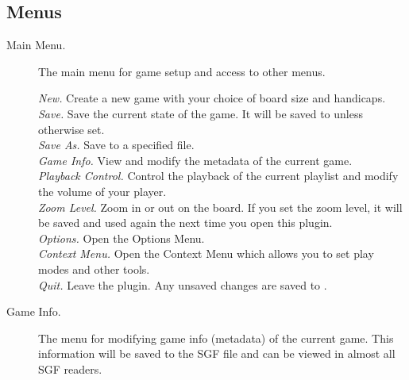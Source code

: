 \subsection{Menus}
\begin {description}
\item [Main Menu. ]
    The main menu for game setup and access to other menus.

    \emph {New. } Create a new game with your choice of board size and handicaps. \\
    \emph {Save. } Save the current state of the game.  It will be saved to
     unless otherwise set. \\
    \emph {Save As. } Save to a specified file. \\
    \emph {Game Info. } View and modify the metadata of the current game. \\
    \emph {Playback Control. } Control the playback of the current playlist and
    modify the volume of your player. \\
    \emph {Zoom Level. } Zoom in or out on the board.  If you set the zoom level, it
    will be saved and used again the next time you open this plugin. \\
    \emph {Options. } Open the Options Menu. \\
    \emph {Context Menu. } Open the Context Menu which allows you to set play modes
    and other tools. \\
    \emph {Quit. } Leave the plugin.  Any unsaved changes are saved to
    . \\

\item [Game Info. ]
    The menu for modifying game info (metadata) of the current game.  This
    information will be saved to the SGF file and can be viewed in almost all
    SGF readers.


\end{description}
